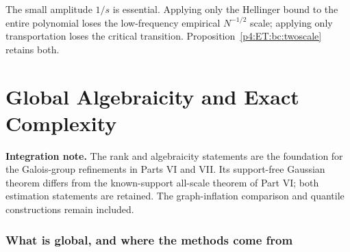 \documentclass[11pt,a4paper]{article}
\theoremstyle{definition}
\theoremstyle{remark}
\numberwithin{equation}{section}
\newcommand{\collectedpart}[1]{%
 \clearpage\part{#1}%
 \setcounter{section}{0}%
 \renewcommand{\thesection}{\Roman{part}.\arabic{section}}%
 \renewcommand{\theHsection}{p\arabic{part}.s\arabic{section}}%
 \renewcommand{\arraystretch}{1}%
}
\begin{document}
The small amplitude $1/s$ is essential. Applying only the Hellinger
bound to the entire polynomial loses the low-frequency empirical
$N^{-1/2}$ scale; applying only transportation loses the critical
transition. Proposition~\ref{p4:ET:bc:twoscale} retains both.


\collectedpart{Global Algebraicity and Exact Complexity}\label{part:5}

\begin{abstract}
We establish three complete classifications using methods from coefficient
asymptotics, differential modules, and arithmetic inverse periods.
First, for every integer $r\ge1$ and every complex weight $\lambda$,
the weighted Franel generating function
$\sum_{n\ge0}\sum_{k=0}^n\binom nk^r\lambda^kz^n$, and its even
section, are algebraic precisely when $r\le2$ or $\lambda=0$.
A global torus maximum inequality resolves complex cancellation, and
an arithmetic Puiseux obstruction finishes the classification.
Second, the exact minimal differential order of every anisotropic
hypercubic lattice Green function is determined solely by the
multiplicities of its nonzero squared weights. The formula holds in
every dimension and at every complex specialization, including
colliding thresholds. Irreducibility and local monodromy imply that
the function is algebraic exactly when at most one weight is nonzero.
Third, all algebraic quantiles at algebraic levels for rational
polynomial tilts of the arcsine law are classified by cyclotomic
factors. Every allowable finite exceptional set is realized, with
minimum polynomial degree one plus its cardinality.
Two further transfers prove sharp support-free Gaussian likelihood
recovery throughout a specified growing-support regime and an exact
design-comparison constant for dense inflations of every fixed graph
skeleton. The arguments are given in full, with classical inputs,
previously known cases, and remaining limitations stated explicitly.
\end{abstract}

\noindent\textbf{Integration note.} The rank and algebraicity statements are the foundation for the Galois-group refinements in Parts VI and VII. Its support-free Gaussian theorem differs from the known-support all-scale theorem of Part VI; both estimation statements are retained. The graph-inflation comparison and quantile constructions remain included.
\clearpage

\section{What is global, and where the methods come from}
\end{document}
